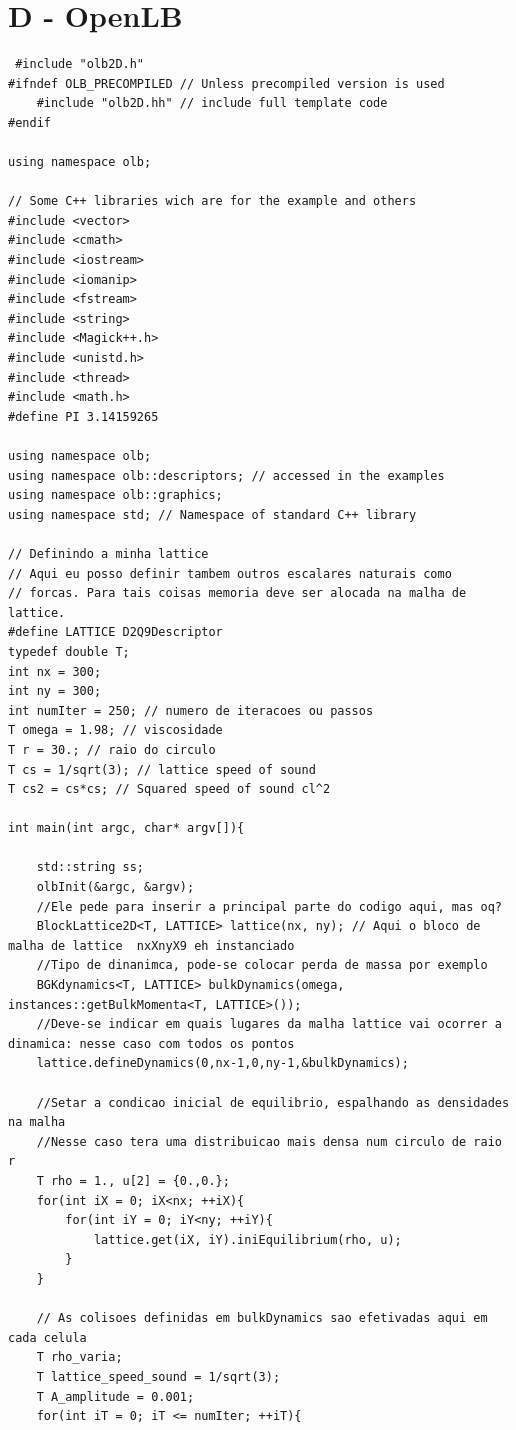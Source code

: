  \section{D - OpenLB}
 \begin{lstlisting}
 #include "olb2D.h"
#ifndef OLB_PRECOMPILED // Unless precompiled version is used
    #include "olb2D.hh" // include full template code
#endif

using namespace olb;

// Some C++ libraries wich are for the example and others
#include <vector>
#include <cmath>
#include <iostream>
#include <iomanip> 
#include <fstream>
#include <string>
#include <Magick++.h> 
#include <unistd.h>
#include <thread>  
#include <math.h>
#define PI 3.14159265

using namespace olb;
using namespace olb::descriptors; // accessed in the examples
using namespace olb::graphics; 
using namespace std; // Namespace of standard C++ library

// Definindo a minha lattice
// Aqui eu posso definir tambem outros escalares naturais como
// forcas. Para tais coisas memoria deve ser alocada na malha de lattice.
#define LATTICE D2Q9Descriptor
typedef double T;
int nx = 300;
int ny = 300;
int numIter = 250; // numero de iteracoes ou passos
T omega = 1.98; // viscosidade
T r = 30.; // raio do circulo
T cs = 1/sqrt(3); // lattice speed of sound
T cs2 = cs*cs; // Squared speed of sound cl^2 

int main(int argc, char* argv[]){

    std::string ss;
    olbInit(&argc, &argv);
    //Ele pede para inserir a principal parte do codigo aqui, mas oq?
    BlockLattice2D<T, LATTICE> lattice(nx, ny); // Aqui o bloco de malha de lattice  nxXnyX9 eh instanciado
    //Tipo de dinanimca, pode-se colocar perda de massa por exemplo
    BGKdynamics<T, LATTICE> bulkDynamics(omega, instances::getBulkMomenta<T, LATTICE>());
    //Deve-se indicar em quais lugares da malha lattice vai ocorrer a dinamica: nesse caso com todos os pontos
    lattice.defineDynamics(0,nx-1,0,ny-1,&bulkDynamics);
    
    //Setar a condicao inicial de equilibrio, espalhando as densidades na malha
    //Nesse caso tera uma distribuicao mais densa num circulo de raio r
    T rho = 1., u[2] = {0.,0.};
    for(int iX = 0; iX<nx; ++iX){
        for(int iY = 0; iY<ny; ++iY){
            lattice.get(iX, iY).iniEquilibrium(rho, u);
        }
    }

    // As colisoes definidas em bulkDynamics sao efetivadas aqui em cada celula
    T rho_varia;
    T lattice_speed_sound = 1/sqrt(3);
    T A_amplitude = 0.001;
    for(int iT = 0; iT <= numIter; ++iT){


\end{lstlisting}
